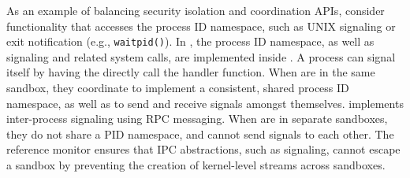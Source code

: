 As an example of balancing security isolation and coordination APIs,
consider functionality that accesses the process ID namespace,
such as UNIX signaling or exit notification (e.g., {\tt waitpid()}).
In \graphene{}, the process ID namespace, 
as well as signaling and related system calls,
are implemented inside \thelibos{}.
A process can signal itself by having the \libos{} directly call the handler function.
When \picoprocs{} are in the same sandbox, they coordinate
to implement a consistent, shared process ID namespace,
as well as to send and receive signals amongst themselves.
\thelibos{} implements inter-process signaling using RPC messaging.
When \picoprocs{} are in separate sandboxes,
they do not share a PID namespace, and cannot send signals to each other.
The reference monitor ensures that IPC abstractions, such as signaling,
cannot escape a sandbox by preventing the creation of kernel-level streams
across sandboxes.




\begin{comment}
Within a sandbox, each library OS tracks the PIDs of other \picoprocs{}.
As children are created, each library OS updates its own replica of the 
process tree, with annotations for which host-level connection corresponds
to the remote process.  
If a \picoproc{} signals itself, the signal system call simply calls the 
appropriate signal handling function in the application. 
If a \picoproc{} signals another \picoproc{},
the signal essentially becomes an asynchronous remote procedure call
from the sending library OS to the receiving library OS.
Note that this is all transparent to the unmodified application.
Section~\ref{sec:graphene:namespaces} describes these library OS-internal
coordination mechanisms in more detail.
The current \graphene{} prototype supports 
a range of coordination abstractions, including signaling, 
exit notification, System V message queues, thread identifiers and groups, sessions,
and the process tree.
We believe this sample is sufficiently representative that
remaining tail of Linux IPC abstractions could be easily added.

The reference monitor ensures security isolation
simply by preventing \picoprocs{} in different sandboxes from 
sharing host-level streams.
We adopted this approach to maximize dynamic sandboxing flexibility,
rather than, say, attempt to multiplex one single library OS instance across multiple processes.
\end{comment}


